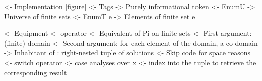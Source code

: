 

\begin{wstructure}
<- Implementation [figure]      
    <- Tags
        -> Purely informational token
    <- EnumU
        -> Universe of finite sets
    <- EnumT e
        -> Elements of finite set e
\end{wstructure}



%




\begin{wstructure}
<- Equipment
    <- \spi operator
        <- Equivalent of Pi on finite sets
        <- First argument: (finite) domain
        <- Second argument: for each element of the domain, a co-domain
        -> Inhabitant of \spi: right-nested tuple of solutions
            <- Skip code for space reasons
    <- switch operator
        <- case analyses over x
        <- index into the \spi tuple to retrieve the corresponding result
\end{wstructure}

